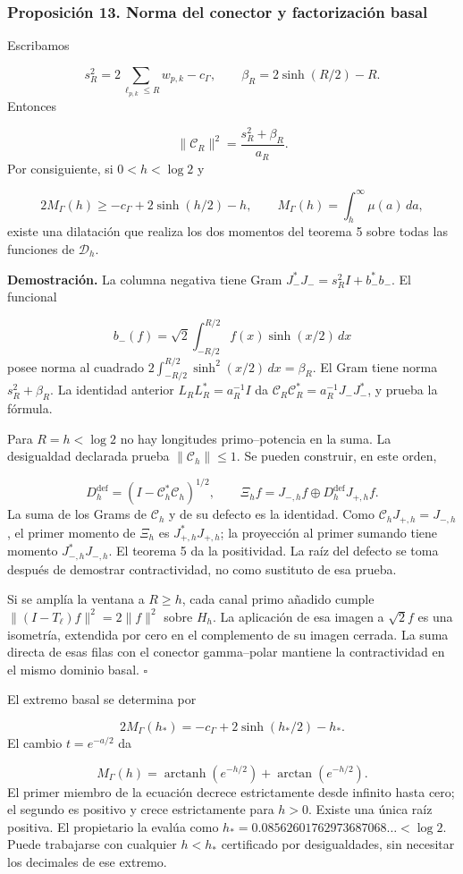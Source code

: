 \subsubsection*{Proposición 13. Norma del conector y factorización basal}
Escribamos

\[
s_R^2=2\sum_{\ell_{p,k}\leq R}w_{p,k}-c_\Gamma,\qquad
\beta_R=2\sinh(R/2)-R.
\]
Entonces

\[
\|\mathcal C_R\|^2=\frac{s_R^2+\beta_R}{a_R}.
\]
Por consiguiente, si \(0<h<\log2\) y

\[
2M_\Gamma(h)\geq-c_\Gamma+2\sinh(h/2)-h,\qquad
M_\Gamma(h)=\int_h^\infty\mu(a)\,da,
\]
existe una dilatación que realiza los dos momentos del teorema 5 sobre todas las funciones de \(\mathcal D_h\).

\textbf{Demostración.} La columna negativa tiene Gram \(J_-^*J_-=s_R^2I+b_-^*b_-\). El funcional

\[
b_-(f)=\sqrt2\int_{-R/2}^{R/2}f(x)\sinh(x/2)\,dx
\]
posee norma al cuadrado \(2\int_{-R/2}^{R/2}\sinh^2(x/2)\,dx=\beta_R\). El Gram tiene norma \(s_R^2+\beta_R\). La identidad anterior \(L_RL_R^*=a_R^{-1}I\) da \(\mathcal C_R\mathcal C_R^*=a_R^{-1}J_-J_-^*\), y prueba la fórmula.

Para \(R=h<\log2\) no hay longitudes primo–potencia en la suma. La desigualdad declarada prueba \(\|\mathcal C_h\|\leq1\). Se pueden construir, en este orden,

\[
D_h^{\mathrm{def}}=(I-\mathcal C_h^*\mathcal C_h)^{1/2},
\qquad
\Xi_hf=J_{-,h}f\oplus D_h^{\mathrm{def}}J_{+,h}f.
\]
La suma de los Grams de \(\mathcal C_h\) y de su defecto es la identidad. Como \(\mathcal C_hJ_{+,h}=J_{-,h}\), el primer momento de \(\Xi_h\) es \(J_{+,h}^*J_{+,h}\); la proyección al primer sumando tiene momento \(J_{-,h}^*J_{-,h}\). El teorema 5 da la positividad. La raíz del defecto se toma después de demostrar contractividad, no como sustituto de esa prueba.

Si se amplía la ventana a \(R\geq h\), cada canal primo añadido cumple \(\|(I-T_\ell)f\|^2=2\|f\|^2\) sobre \(H_h\). La aplicación de esa imagen a \(\sqrt2f\) es una isometría, extendida por cero en el complemento de su imagen cerrada. La suma directa de esas filas con el conector gamma–polar mantiene la contractividad en el mismo dominio basal. \hfill\(\square\)

El extremo basal se determina por

\[
2M_\Gamma(h_*)=-c_\Gamma+2\sinh(h_*/2)-h_*.
\]
El cambio \(t=e^{-a/2}\) da

\[
M_\Gamma(h)=\operatorname{arctanh}(e^{-h/2})
+\arctan(e^{-h/2}).
\]
El primer miembro de la ecuación decrece estrictamente desde infinito hasta cero; el segundo es positivo y crece estrictamente para \(h>0\). Existe una única raíz positiva. El propietario la evalúa como \(h_*=0.08562601762973687068\ldots<\log2\). Puede trabajarse con cualquier \(h<h_*\) certificado por desigualdades, sin necesitar los decimales de ese extremo.

